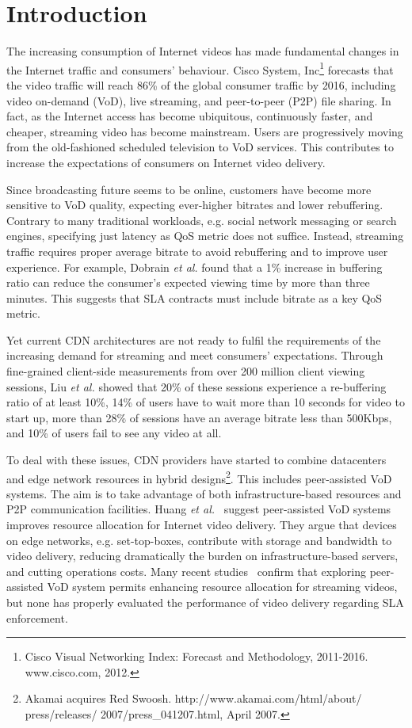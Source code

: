 \section{Introduction}

The increasing consumption of Internet videos has made fundamental changes in the Internet traffic and consumers' behaviour. Cisco System, Inc\footnote{Cisco Visual Networking Index: Forecast and Methodology, 2011-2016. www.cisco.com, 2012.} forecasts that the video traffic will reach 86\% of the global consumer traffic by 2016, including video on-demand (VoD), live streaming, and peer-to-peer (P2P) file sharing. In fact, as the Internet access has become ubiquitous, continuously faster, and cheaper, streaming video has become mainstream. Users are progressively moving from the old-fashioned scheduled television to VoD services. This contributes to increase the expectations of consumers on Internet video delivery. 

Since broadcasting future seems to be online, customers have become more sensitive to VoD quality, expecting ever-higher bitrates and lower rebuffering. Contrary to many traditional workloads, e.g. social network messaging or search engines, specifying just latency as QoS metric does not suffice. Instead, streaming traffic requires proper average bitrate to avoid rebuffering and to improve user experience. For example, Dobrain \emph{et al.}\cite{Dobrian_sigcomm_2011} found that a 1\% increase in buffering ratio can reduce the consumer's expected viewing time by more than three minutes. This suggests that SLA contracts must include bitrate as a key QoS metric. 

Yet current CDN architectures are not ready to fulfil the requirements of the increasing demand for streaming and meet consumers' expectations. Through fine-grained client-side measurements from over 200 million client viewing sessions, Liu \emph{et al.}\cite{Liu_sigcomm_2012} showed that 20\% of these sessions experience a re-buffering ratio of at least 10\%, 14\% of users have to wait more than 10 seconds for video to start up, more than 28\% of sessions have an average bitrate less than 500Kbps, and 10\% of users fail to see any video at all.

To deal with these issues, CDN providers have started to combine datacenters and edge network resources in hybrid designs\footnote{Akamai acquires Red Swoosh. http://www.akamai.com/html/about/ press/releases/ 2007/press\_041207.html, April 2007.}. This includes peer-assisted VoD systems. The aim is to take advantage of both infrastructure-based resources and P2P communication facilities. Huang \emph{et al.}~\cite{profitable_vod_sigcomm_07} suggest peer-assisted VoD systems improves resource allocation for Internet video delivery. They argue that devices on edge networks, e.g. set-top-boxes, contribute with storage and bandwidth to video delivery, reducing dramatically the burden on infrastructure-based servers, and cutting operations costs. Many recent studies~\cite{parvez_bittorrent_analysis_sigmetrics08,huang2008challenges_sigcomm08,pavod_icnp12} confirm that exploring peer-assisted VoD system permits enhancing resource allocation for streaming videos, but none has properly evaluated the performance of video delivery regarding SLA enforcement. 

